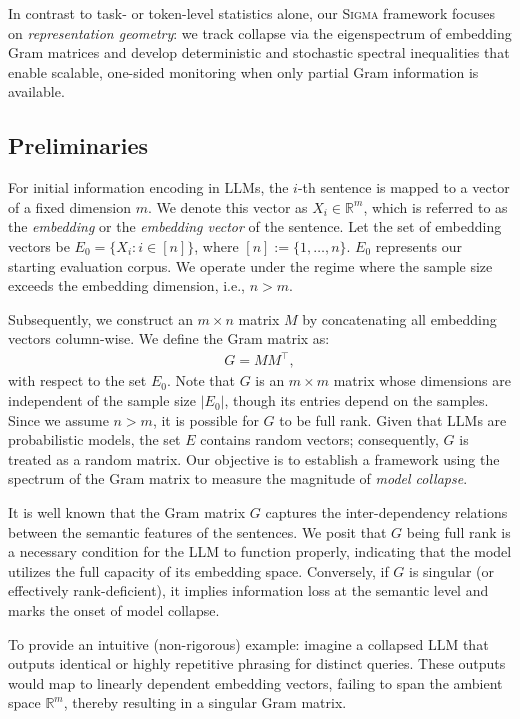 \documentclass{article}
\theoremstyle{plain}
\theoremstyle{definition}
\theoremstyle{remark}
\newcommand{\sgma}{\textsc{Sigma}\xspace}
\begin{document}
In contrast to task- or token-level statistics alone, our \sgma framework focuses on \emph{representation geometry}: we track collapse via the eigenspectrum of embedding Gram matrices and develop deterministic and stochastic spectral inequalities that enable scalable, one-sided monitoring when only partial Gram information is available.

\subsection{Preliminaries}  \label{sec:prelim}

For initial information encoding in LLMs, the $i$-th sentence is mapped to a vector of a fixed dimension $m$. We denote this vector as $X_i \in \mathbb{R}^m$, which is referred to as the \textit{embedding} or the  \textit{embedding vector} of the sentence. Let the set of embedding vectors be $E_0 = \{X_i : i \in [n]\}$, where $[n]:= \{1,\dots,n\}$. $E_0$ represents our starting evaluation corpus. We operate under the regime where the sample size exceeds the embedding dimension, i.e., $n > m$.

Subsequently, we construct an $m \times n$ matrix $M$ by concatenating all embedding vectors column-wise. We define the Gram matrix as:
\begin{align}
    G = MM^{\!\top},
\end{align}
with respect to the set $E_0$. Note that $G$ is an $m \times m$ matrix whose dimensions are independent of the sample size $|E_0|$, though its entries depend on the samples. Since we assume $n > m$, it is possible for $G$ to be full rank. Given that LLMs are probabilistic models, the set $E$ contains random vectors; consequently, $G$ is treated as a random matrix. Our objective is to establish a framework using the spectrum of the Gram matrix to measure the magnitude of \textit{model collapse}.

It is well known that the Gram matrix $G$ captures the inter-dependency relations between the semantic features of the sentences. We posit that $G$ being full rank is a necessary condition for the LLM to function properly, indicating that the model utilizes the full capacity of its embedding space. Conversely, if $G$ is singular (or effectively rank-deficient), it implies information loss at the semantic level and marks the onset of model collapse. 

To provide an intuitive (non-rigorous) example: imagine a collapsed LLM that outputs identical or highly repetitive phrasing for distinct queries. These outputs would map to linearly dependent embedding vectors, failing to span the ambient space $\mathbb{R}^m$, thereby resulting in a singular Gram matrix.
\end{document}
